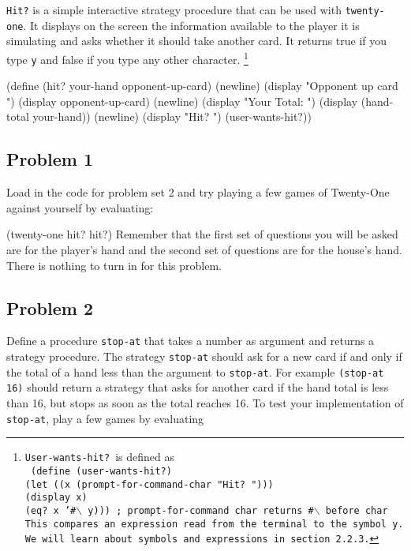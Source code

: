 {\tt Hit?} is a simple interactive strategy procedure that can be used
with {\tt twenty-one}. It displays on the screen the information
available to the player it is simulating and asks whether it should
take another card.  It returns true if you type {\tt y} and false if
you type any other character.  \footnote{{\tt User-wants-hit?}\ is
defined as\\

\tt{
\indent\indent\indent(define (user-wants-hit?)\\
\indent\indent\indent\indent(let ((x (prompt-for-command-char "Hit? ")))\\
\indent\indent\indent\indent\indent(display x)\\
\indent\indent\indent\indent\indent(eq? x '\#$\backslash$ y)))}\ ; prompt-for-command char returns \#$\backslash$ before char\\

\noindent \textnormal{This compares an expression read from the terminal to the
symbol {\tt y}.  We will learn about symbols and expressions in
section 2.2.3.}}

\beginlisp
(define (hit? your-hand opponent-up-card)
  (newline)
  (display "Opponent up card ")
  (display opponent-up-card)
  (newline)
  (display "Your Total: ")
  (display (hand-total your-hand))
  (newline)
  (display "Hit? ")
  (user-wants-hit?))
\endlisp
\subsection{Problem 1}

Load in the code for problem set 2 and try playing a few games of
Twenty-One against yourself by evaluating:

\beginlisp
(twenty-one hit? hit?)
\endlisp
Remember that the first set of questions you will be asked are for the
player's hand and the second set of questions are for the house's hand.
There is nothing to turn in for this problem.

\subsection{Problem 2}

Define a procedure {\tt stop-at} that takes a number as argument and
returns a strategy procedure.  The strategy {\tt stop-at} should ask
for a new card if and only if the total of a hand less than the
argument to {\tt stop-at}.  For example {\tt (stop-at 16)} should
return a strategy that asks for another card if the hand total is less
than 16, but stops as soon as the total reaches 16.  To test your
implementation of {\tt stop-at}, play a few games by evaluating

